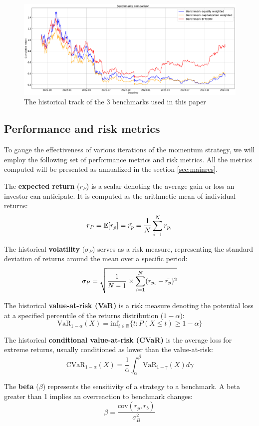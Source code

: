 \documentclass{article}
\begin{document}
\begin{figure}[H] %
	\centering
	\includegraphics[width=1\linewidth]{benchmarks_only.png}
	\caption{The historical track of the 3 benchmarks used in this paper}
	\label{fig:fig1}
\end{figure}

\subsection{Performance and risk metrics}
To gauge the effectiveness of various iterations of the momentum strategy, we will employ the following set of performance metrics and risk metrics. All the metrics computed will be presented as annualized in the section \ref{sec:mainres}.


The \textbf{expected return} (\(r_P\)) is a scalar denoting the average gain or loss an investor can anticipate. It is computed as the arithmetic mean of individual returns:
\[r_P=\mathbb{E}[r_p]=\Bar{r_p}=\frac{1}{N}\sum_{i=1}^Nr_{p_i}\]

The historical \textbf{volatility} (\(\sigma_P\)) serves as a risk measure, representing the standard deviation of returns around the mean over a specific period:
\[\sigma_P = \sqrt{\frac{1}{N-1}\times\sum^N_{i=1}(r_{p_i}-\Bar{r_p})^2}\]

The historical \textbf{value-at-risk (VaR)} is a risk measure denoting the potential loss at a specified percentile of the returns distribution (\(1-\alpha\)):
\[\text{VaR}_{1-\alpha}(X)=\text{inf}_{t\in\mathbb{R}}\{t:P(X\leq t)\geq1-\alpha\}\]

The historical \textbf{conditional value-at-risk (CVaR)} is the average loss for extreme returns, usually conditioned as lower than the value-at-risk:
\[\text{CVaR}_{1-\alpha}(X)=\frac{1}{\alpha}\int_\alpha^\beta\text{VaR}_{1-\gamma}(X)d\gamma\]

The \textbf{beta} (\(\beta\)) represents the sensitivity of a strategy to a benchmark. A beta greater than 1 implies an overreaction to benchmark changes:
\[\beta = \frac{\text{cov}(r_p,r_b)}{\sigma_B^2}\]
\end{document}
